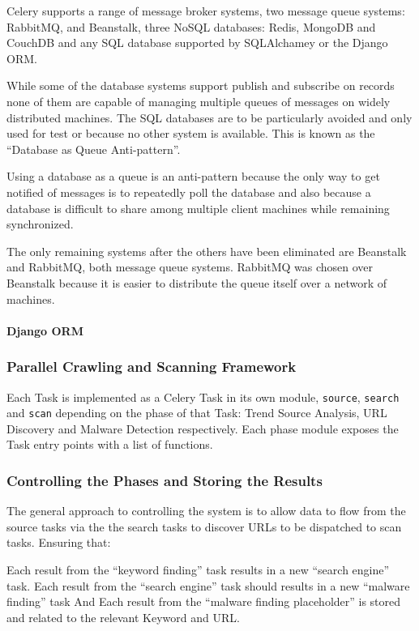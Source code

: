 Celery supports a range of message broker systems, two message queue systems: RabbitMQ, and Beanstalk, three NoSQL databases: Redis, MongoDB and CouchDB and any SQL database supported by SQLAlchamey or the Django ORM.

While some of the database systems support publish and subscribe on records none of them are capable of managing multiple queues of messages on widely distributed machines.  The SQL databases are to be particularly avoided and only used for test or because no other system is available. This is known as the ``Database as Queue Anti-pattern''\cite{database-as-mq}.

Using a database as a queue is an anti-pattern because the only way to get notified of messages is to repeatedly poll the database and also because a database is difficult to share among multiple client machines while remaining synchronized.

The only remaining systems after the others have been eliminated are Beanstalk and RabbitMQ, both message queue systems. RabbitMQ was chosen over Beanstalk because it is easier to distribute the queue itself over a network of machines.

\paragraph{Django ORM}

\subsubsection{Parallel Crawling and Scanning Framework}
Each Task is implemented as a Celery Task in its own module, \verb`source`, \verb`search` and \verb`scan` depending on the phase of that Task: Trend Source Analysis, URL Discovery and Malware Detection respectively. Each phase module exposes the Task entry points with a list of functions.

\subsubsection{Controlling the Phases and Storing the Results}
The general approach to controlling the system is to allow data to flow from the source tasks via the the search tasks to discover URLs to be dispatched to scan tasks. Ensuring that:

Each result from the ``keyword finding'' task results in a new ``search engine'' task.
Each result from the ``search engine'' task should results in a new ``malware finding'' task
And Each result from the ``malware finding placeholder'' is stored and related to the relevant Keyword and URL.

